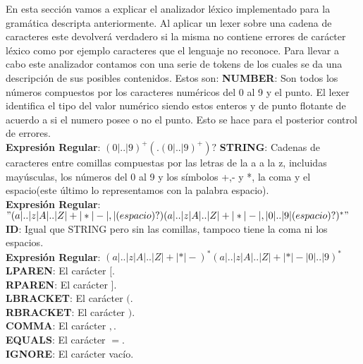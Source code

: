 En esta sección vamos a explicar el analizador léxico implementado para la gramática descripta anteriormente. Al aplicar un
lexer sobre una cadena de caracteres este devolverá verdadero si la misma no contiene errores de carácter léxico como por
ejemplo caracteres que el lenguaje no reconoce. Para llevar a cabo este analizador contamos con una serie de tokens de
los cuales se da una descripción de sus posibles contenidos. Estos son:
\newline
\newline
\textbf{NUMBER}: Son todos los números compuestos por los caracteres numéricos del 0 al 9 y el punto. El lexer identifica el tipo
del valor numérico siendo estos enteros y de punto flotante de acuerdo a si el numero posee o no el punto. Esto se hace
para el posterior control de errores.\\
\textbf{Expresi\'on Regular}: $(0|..|9)^{+}(.(0|..|9)^{+})?$
\newline
\newline
\textbf{STRING}: Cadenas de caracteres entre comillas compuestas por las letras de la a a la z, incluidas mayúsculas, los números del
0 al 9 y los símbolos +,- y *, la coma y el espacio(este último lo representamos con la palabra espacio).\\
\textbf{Expresi\'on Regular}: $"(a|..|z|A|..|Z|+|*|-|,|(espacio)?)(a|..|z|A|..|Z|+|*|-|,|0|..|9|(espacio)?)^{*}"$
\newline
\newline
\textbf{ID}: Igual que STRING pero sin las comillas, tampoco tiene la coma ni los espacios.\\
\textbf{Expresi\'on Regular}: $(a|..|z|A|..|Z|+|*|-)^{*}(a|..|z|A|..|Z|+|*|-|0|..|9)^{*}$
\newline
\newline
\textbf{LPAREN}: El carácter $[$.\\
\newline
\textbf{RPAREN}: El carácter $]$.\\
\newline
\textbf{LBRACKET}: El carácter $($.\\
\newline
\textbf{RBRACKET}: El carácter $)$.\\
\newline
\textbf{COMMA}: El carácter $,$.\\
\newline
\textbf{EQUALS}: El carácter $=$.\\
\newline
\textbf{IGNORE}: El carácter vacío.\\
